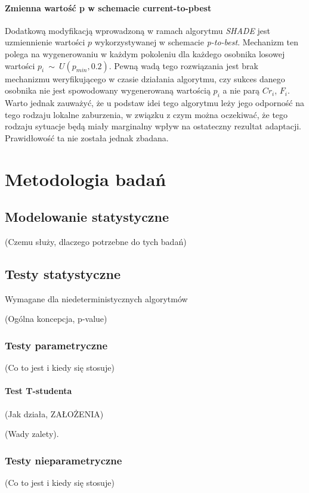 \documentclass[12pt,a4paper]{report}
\begin{document}
{{{\begin{description}
\subsubsection{Zmienna wartość p w schemacie current-to-pbest}
\par{
Dodatkową modyfikacją wprowadzoną w ramach algorytmu \emph{SHADE} jest uzmiennienie wartości $p$ wykorzystywanej w schemacie \emph{p-to-best}. Mechanizm ten polega na wygenerowaniu w każdym pokoleniu dla każdego osobnika losowej wartości $p_i~\sim~U(p_{min}, 0.2)$. Pewną wadą tego rozwiązania jest brak mechanizmu weryfikującego w czasie działania algorytmu, czy sukces danego osobnika nie jest spowodowany wygenerowaną wartością $p_i$ a nie parą $Cr_i$, $F_i$. Warto jednak zauważyć, że u podstaw idei tego algorytmu leży jego odporność na tego rodzaju lokalne zaburzenia, w związku z czym można oczekiwać, że tego rodzaju sytuacje będą miały marginalny wpływ na ostateczny rezultat adaptacji. Prawidłowość ta nie została jednak zbadana.
}
\end{description}

\chapter{Metodologia badań}
\section{Modelowanie statystyczne}
\par{
(Czemu służy, dlaczego potrzebne do tych badań)
}
\section{Testy statystyczne}
\par{
Wymagane dla niedeterministycznych algorytmów
}
\par{
(Ogólna koncepcja, p-value)
}
\subsection{Testy parametryczne}
\par{
(Co to jest i kiedy się stosuje)
}
\subsubsection{Test T-studenta}
\par{
(Jak działa, ZAŁOŻENIA)
}
\par{
(Wady zalety).
}

\subsection{Testy nieparametryczne}
\par{
(Co to jest i kiedy się stosuje)
}
}}}
\end{document}
